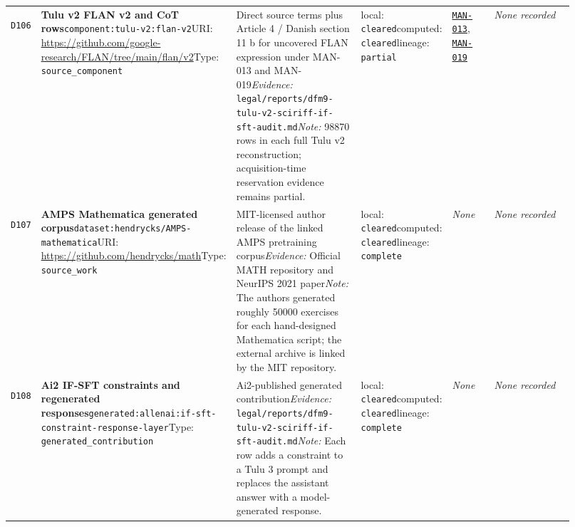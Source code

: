 \documentclass[9pt,a4paper]{article}
\newcommand{\depid}[1]{\hypertarget{dep:#1}{\texttt{#1}}}
\begin{document}
\begin{landscape}
\begin{longtable}{@{}L{0.035\linewidth}L{0.185\linewidth}L{0.27\linewidth}L{0.09\linewidth}L{0.10\linewidth}L{0.24\linewidth}@{}}
\depid{D106} & \textbf{Tulu v2 FLAN v2 and CoT rows}\newline \nolinkurl{component:tulu-v2:flan-v2}\newline URI: \url{https://github.com/google-research/FLAN/tree/main/flan/v2}\newline Type: \texttt{source\_component} & Direct source terms plus Article 4 / Danish section 11 b for uncovered FLAN expression under MAN-013 and MAN-019\newline \textit{Evidence:} \nolinkurl{legal/reports/dfm9-tulu-v2-sciriff-if-sft-audit.md}\newline \textit{Note:} 98870 rows in each full Tulu v2 reconstruction; acquisition-time reservation evidence remains partial. & local: \texttt{cleared}\newline computed: \texttt{cleared}\newline lineage: \texttt{partial} & \hyperlink{manual:MAN-013}{\texttt{MAN-013}}, \hyperlink{manual:MAN-019}{\texttt{MAN-019}} & \textit{None recorded} \\
\depid{D107} & \textbf{AMPS Mathematica generated corpus}\newline \nolinkurl{dataset:hendrycks/AMPS-mathematica}\newline URI: \url{https://github.com/hendrycks/math}\newline Type: \texttt{source\_work} & MIT-licensed author release of the linked AMPS pretraining corpus\newline \textit{Evidence:} Official MATH repository and NeurIPS 2021 paper\newline \textit{Note:} The authors generated roughly 50000 exercises for each hand-designed Mathematica script; the external archive is linked by the MIT repository. & local: \texttt{cleared}\newline computed: \texttt{cleared}\newline lineage: \texttt{complete} & \textit{None} & \textit{None recorded} \\
\depid{D108} & \textbf{Ai2 IF-SFT constraints and regenerated responses}\newline \nolinkurl{generated:allenai:if-sft-constraint-response-layer}\newline Type: \texttt{generated\_contribution} & Ai2-published generated contribution\newline \textit{Evidence:} \nolinkurl{legal/reports/dfm9-tulu-v2-sciriff-if-sft-audit.md}\newline \textit{Note:} Each row adds a constraint to a Tulu 3 prompt and replaces the assistant answer with a model-generated response. & local: \texttt{cleared}\newline computed: \texttt{cleared}\newline lineage: \texttt{complete} & \textit{None} & \textit{None recorded} \\

\end{longtable}
\end{landscape}
\end{document}

